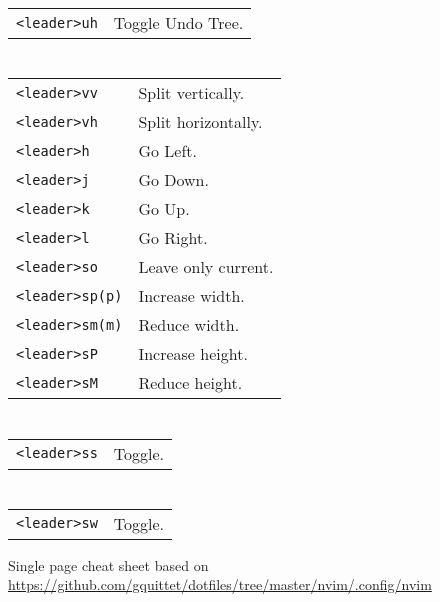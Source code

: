 \begin{multicols}{3}
\section{}
\begin{tabular}{@{}ll@{}}
	\verb!<leader>uh! & Toggle Undo Tree. \\
\end{tabular}

\section{}
\begin{tabular}{@{}ll@{}}
	\verb!<leader>vv! & Split vertically. \\
	\verb!<leader>vh! & Split horizontally. \\
	\verb!<leader>h! & Go Left. \\
	\verb!<leader>j! & Go Down. \\
	\verb!<leader>k! & Go Up. \\
	\verb!<leader>l! & Go Right. \\
	\verb!<leader>so! & Leave only current. \\
    \verb!<leader>sp(p)! & Increase width. \\
    \verb!<leader>sm(m)! & Reduce width. \\
	\verb!<leader>sP! & Increase height. \\
	\verb!<leader>sM! & Reduce height. \\
\end{tabular}

\section{}
\begin{tabular}{@{}ll@{}}
	\verb!<leader>ss! & Toggle. \\
\end{tabular}

\section{}
\begin{tabular}{@{}ll@{}}
	\verb!<leader>sw! & Toggle. \\
\end{tabular}

Single page cheat sheet based on \url{https://github.com/gquittet/dotfiles/tree/master/nvim/.config/nvim}

\end{multicols}

